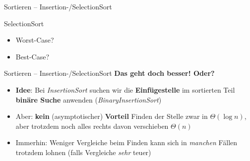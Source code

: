 \begin{frame}{Sortieren – Insertion-/SelectionSort}
	\begin{exampleblock}{SelectionSort}
		\begin{algorithm}[H]
		\end{algorithm}
	\end{exampleblock}
	\begin{itemize}
		\item Worst-Case? \only<2>{\impl  $\Theta(n^2)$ (immer)}
		\item Best-Case? \only<2>{\impl  $\Theta(n^2)$ (immer)}
	\end{itemize}
\end{frame}


\begin{frame}{Sortieren – Insertion-/SelectionSort}
	\textbf{Das geht doch besser! Oder?}
	\pause
	\begin{itemize}
		\item \textbf{Idee}: Bei \emph{InsertionSort} suchen wir die \textbf{Einfügestelle} im sortierten Teil \impl \textbf{binäre Suche} anwenden (\emph{BinaryInsertionSort})
		\pause
		\item Aber: \textbf{kein} (asymptotischer) \textbf{Vorteil} \impl   
		Finden der Stelle zwar in $\Theta(\log n)$, aber trotzdem noch alles rechts davon verschieben \impl $\Theta(n)$
		\pause
		\item[\Pros] Immerhin: Weniger Vergleiche beim Finden \impl kann sich in \textit{manchen} Fällen trotzdem lohnen (falls Vergleiche \textit{sehr} teuer)
	\end{itemize}
\end{frame}


